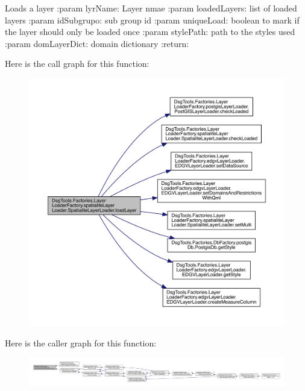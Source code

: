 \begin{DoxyVerb}Loads a layer
:param lyrName: Layer nmae
:param loadedLayers: list of loaded layers
:param idSubgrupo: sub group id
:param uniqueLoad: boolean to mark if the layer should only be loaded once
:param stylePath: path to the styles used
:param domLayerDict: domain dictionary
:return:
\end{DoxyVerb}
 Here is the call graph for this function\+:
\nopagebreak
\begin{figure}[H]
\begin{center}
\leavevmode
\includegraphics[width=350pt]{class_dsg_tools_1_1_factories_1_1_layer_loader_factory_1_1spatialite_layer_loader_1_1_spatialite_layer_loader_a56968bee64a3c937eea1bf57ab66bee1_cgraph}
\end{center}
\end{figure}
Here is the caller graph for this function\+:
\nopagebreak
\begin{figure}[H]
\begin{center}
\leavevmode
\includegraphics[width=350pt]{class_dsg_tools_1_1_factories_1_1_layer_loader_factory_1_1spatialite_layer_loader_1_1_spatialite_layer_loader_a56968bee64a3c937eea1bf57ab66bee1_icgraph}
\end{center}
\end{figure}
